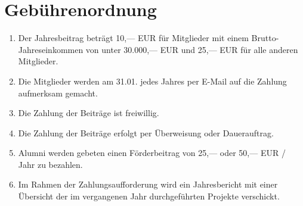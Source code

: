\documentclass[
	fontsize=12pt,
	paper=a4,
	DIV14,
	parskip,
]{scrreprt}
\begin{document}
\section{Gebührenordnung}
\begin{enumerate}[\qquad(1)]
	\item Der Jahresbeitrag beträgt 10,— EUR für Mitglieder mit einem Brutto-Jahreseinkommen von unter 30.000,— EUR und 25,— EUR für alle anderen Mitglieder.
	\item Die Mitglieder werden am 31.01. jedes Jahres per E-Mail auf die Zahlung
		aufmerksam gemacht.
	\item Die Zahlung der Beiträge ist freiwillig.
	\item Die Zahlung der Beiträge erfolgt per Überweisung oder Dauerauftrag.
	\item Alumni werden gebeten einen Förderbeitrag von 25,— oder 50,— EUR / Jahr
		zu bezahlen.
	\item Im Rahmen der Zahlungsaufforderung wird ein Jahresbericht mit einer
		Übersicht der im vergangenen Jahr durchgeführten Projekte verschickt.
\end{enumerate}
\end{document}
